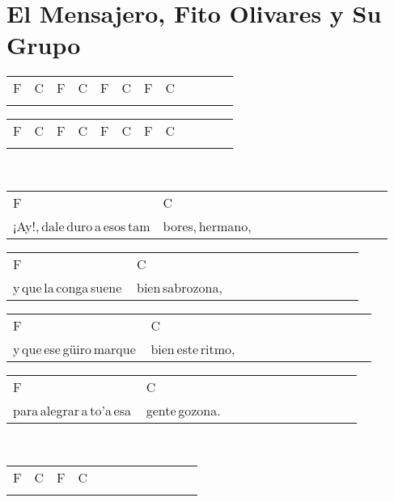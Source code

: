 \section*{El Mensajero, Fito Olivares y Su Grupo\hfill}
\begin{multicols}{2}
\noindent
\begin{minipage}{\columnwidth}
\noindent
\noindent
\begin{tabular}{llllllllllll}
F&C&F&C&F&C&F&C\\
\quad\quad\quad\quad&\quad\quad\quad\quad&\quad\quad\quad\quad&\quad\quad\quad\quad&\quad\quad\quad\quad&\quad\quad\quad\quad&\quad\quad\quad\quad&
\end{tabular}

\noindent
\begin{tabular}{llllllllllll}
F&C&F&C&F&C&F&C\\
\quad\quad\quad\quad&\quad\quad\quad\quad&\quad\quad\quad\quad&\quad\quad\quad\quad&\quad\quad\quad\quad&\quad\quad\quad\quad&\quad\quad\quad\quad&
\end{tabular}
\end{minipage}\\

\noindent
\begin{minipage}{\columnwidth}
\noindent
\noindent
\begin{tabular}{llllllllllll}
F&C\\
¡Ay!,\,dale\,duro\,a\,esos\,tam&bores,\,hermano,
\end{tabular}

\noindent
\begin{tabular}{llllllllllll}
F&C\\
y\,que\,la\,conga\,suene\,&bien\,sabrozona,
\end{tabular}

\noindent
\begin{tabular}{llllllllllll}
F&C\\
y\,que\,ese\,güiro\,marque\,&bien\,este\,ritmo,
\end{tabular}

\noindent
\begin{tabular}{llllllllllll}
F&C\\
para\,alegrar\,a\,to'a\,esa\,&gente\,gozona.
\end{tabular}
\end{minipage}\\

\noindent
\begin{minipage}{\columnwidth}
\noindent
\noindent
\begin{tabular}{llllllllllll}
F&C&F&C\\
\quad\quad\quad\quad&\quad\quad\quad\quad&\quad\quad\quad\quad&
\end{tabular}
\end{minipage}\\


\end{multicols}
